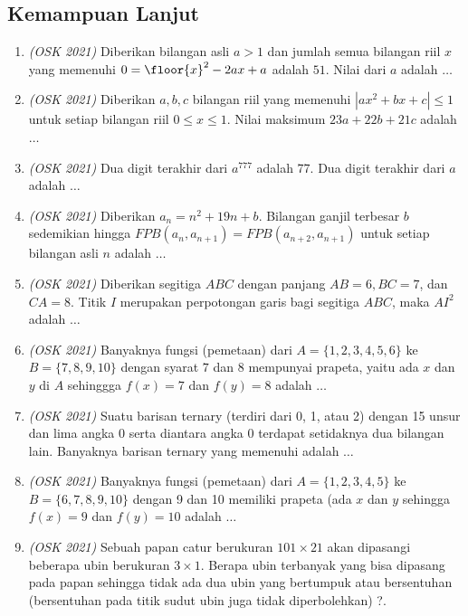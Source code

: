 \documentclass[11pt]{scrartcl}
\begin{document}
\subsection{Kemampuan Lanjut}
\begin{enumerate}
    \item \textit{(OSK 2021)} Diberikan bilangan asli $a > 1$ dan jumlah semua bilangan riil $x$ yang memenuhi $0 = \floor{x}^2-2ax+a$  adalah $51$. Nilai dari $a$ adalah $\dots$

    \item \textit{(OSK 2021)} Diberikan $a,b,c$ bilangan riil yang memenuhi $|ax^2+bx+c| \leq 1$ untuk setiap bilangan riil $0 \leq x \leq 1$. Nilai maksimum $23a+22b+21c$ adalah $\dots$
    
    \item \textit{(OSK 2021)} Dua digit terakhir dari $a^{777}$ adalah 77. Dua digit terakhir dari $a$ adalah $\dots$
    
    \item \textit{(OSK 2021)} Diberikan $a_n = n^2+19n+b$. Bilangan ganjil terbesar $b$ sedemikian hingga $FPB(a_n,a_{n+1}) = FPB(a_{n+2},a_{n+1})$ untuk setiap bilangan asli $n$ adalah $\dots$
    
    \item \textit{(OSK 2021)} Diberikan segitiga $ABC$ dengan panjang $AB = 6, BC = 7$, dan $CA = 8$. Titik $I$ merupakan perpotongan garis bagi segitiga $ABC$, maka $AI^2$ adalah $\dots$
    
    \item \textit{(OSK 2021)} Banyaknya fungsi (pemetaan) dari $A=\{1,2,3,4,5,6\}$ ke $B=\{7,8,9,10\}$ dengan syarat $7$ dan $8$ mempunyai prapeta, yaitu ada $x$ dan $y$ di $A$ sehinggga $f(x)=7$ dan $f(y)=8$ adalah $\dots$
    
    \item \textit{(OSK 2021)} Suatu barisan ternary (terdiri dari 0, 1, atau 2) dengan 15 unsur dan lima angka 0 serta diantara angka 0 terdapat setidaknya dua bilangan lain. Banyaknya barisan ternary yang memenuhi adalah $\dots$
    
    \item \textit{(OSK 2021)} Banyaknya fungsi (pemetaan) dari $A = \{1,2,3,4,5\}$ ke  $B = \{6,7,8,9,10\}$ dengan 9 dan 10 memiliki prapeta (ada $x$ dan $y$ sehingga $f(x) = 9$ dan $f(y) = 10$ adalah $\dots$
    
    \item \textit{(OSK 2021)} Sebuah papan catur berukuran $101 \times 21$ akan dipasangi beberapa ubin berukuran $3 \times 1$. Berapa ubin terbanyak yang bisa dipasang pada papan sehingga tidak ada dua ubin yang bertumpuk atau bersentuhan (bersentuhan pada titik sudut ubin juga tidak diperbolehkan) ?.
    

\end{enumerate}
\end{document}
